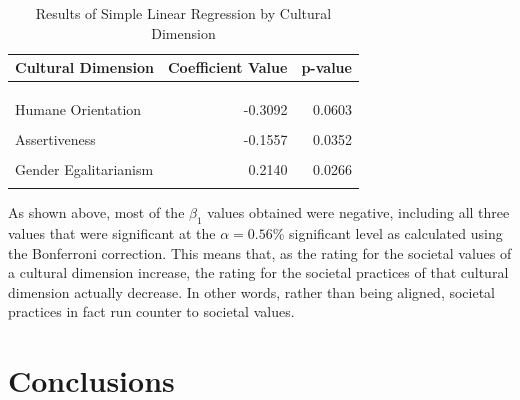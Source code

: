 \documentclass[
]{article}
\begin{document}
\begin{table}

\caption{\label{tab:SPV SLR Table}Results of Simple Linear Regression by Cultural Dimension}
\centering
\begin{tabular}[t]{lrr}
\toprule
Cultural Dimension & Coefficient Value & p-value\\
\midrule
\cellcolor[HTML]{E5F5E0}{\cellcolor{gray!6}{Power Distance}} & \cellcolor[HTML]{E5F5E0}{\cellcolor{gray!6}{-0.6240}} & \cellcolor[HTML]{E5F5E0}{\cellcolor{gray!6}{0.0000}}\\
\cellcolor[HTML]{E5F5E0}{Uncertainty Avoidance} & \cellcolor[HTML]{E5F5E0}{-0.6059} & \cellcolor[HTML]{E5F5E0}{0.0000}\\
\cellcolor[HTML]{E5F5E0}{\cellcolor{gray!6}{Institutional Collectivism}} & \cellcolor[HTML]{E5F5E0}{\cellcolor{gray!6}{-0.4619}} & \cellcolor[HTML]{E5F5E0}{\cellcolor{gray!6}{0.0000}}\\
Humane Orientation & -0.3092 & 0.0603\\
\cellcolor{gray!6}{Future Orientation} & \cellcolor{gray!6}{-0.2545} & \cellcolor{gray!6}{0.0247}\\
\addlinespace
Assertiveness & -0.1557 & 0.0352\\
\cellcolor{gray!6}{Performance Orientation} & \cellcolor{gray!6}{-0.1223} & \cellcolor{gray!6}{0.1861}\\
Gender Egalitarianism & 0.2140 & 0.0266\\
\cellcolor{gray!6}{In-group Collectivism} & \cellcolor{gray!6}{0.6347} & \cellcolor{gray!6}{0.0074}\\
\bottomrule
\end{tabular}
\end{table}

As shown above, most of the \(\beta_1\) values obtained were negative,
including all three values that were significant at the
\(\alpha = 0.56\)\% significant level as calculated using the Bonferroni
correction. This means that, as the rating for the societal values of a
cultural dimension increase, the rating for the societal practices of
that cultural dimension actually decrease. In other words, rather than
being aligned, societal practices in fact run counter to societal
values.

\hypertarget{conclusions}{%
\section{Conclusions}\label{conclusions}}
\end{document}
